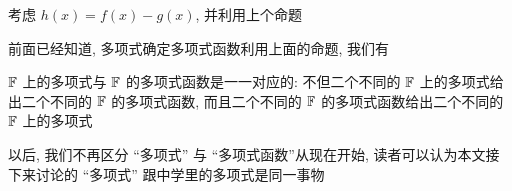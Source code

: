 \begin{pf}
    考虑 $h(x) = f(x) - g(x)$, 并利用上个命题\period
\end{pf}

前面已经知道, 多项式确定多项式函数\period 利用上面的命题, 我们有

\begin{proposition}
    $\mathbb{F}$ 上的多项式与 $\mathbb{F}$ 的多项式函数是一一对应的: 不但二个不同的 $\mathbb{F}$ 上的多项式给出二个不同的 $\mathbb{F}$ 的多项式函数, 而且二个不同的 $\mathbb{F}$ 的多项式函数给出二个不同的 $\mathbb{F}$ 上的多项式\period
\end{proposition}

\begin{remark}
    以后, 我们不再区分 ``多项式'' 与 ``多项式函数''\period 从现在开始, 读者可以认为本文接下来讨论的 ``多项式'' 跟中学里的多项式是同一事物\period
\end{remark}
